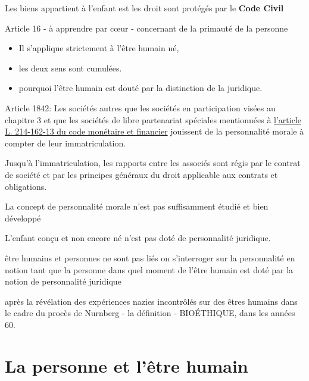 \documentclass[a4paper]{report}
\begin{document}
Les biens appartient à l'enfant est les droit sont protégés par le \textbf{Code Civil}

\begin{remark}
    Article 16 - à apprendre par cœur - concernant de la primauté de la personne
    \begin{itemize}
        \item Il s'applique strictement à l'être humain né,
        \item les deux sens sont cumulées.
        \item pourquoi l'être humain est douté par la distinction de la juridique.
    \end{itemize}
\end{remark}

Article 1842: Les sociétés autres que les sociétés en participation visées au
chapitre $3$ et que les sociétés de libre partenariat spéciales mentionnées à
\underline{l'article L. 214-162-13 du code monétaire et financier} jouissent de
la personnalité morale à compter de leur immatriculation.

Jusqu'à l'immatriculation, les rapports entre les associés sont régis par le
contrat de société et par les principes généraux du droit applicable aux
contrats et obligations.

La concept de personnalité morale n'est pas suffisamment étudié et bien développé

L'enfant conçu et non encore né n'est pas doté de personnalité juridique.

être humains et personnes ne sont pas liés
on s'interroger sur la personnalité en notion tant que la personne
dans quel moment de l'être humain est doté par la notion de personnalité juridique


après la révélation des expériences nazies incontrôlés sur des êtres humains dans le cadre du procès de Nurnberg - la définition - BIOÉTHIQUE, dans les années 60.

\section{La personne et l'être humain}%
\label{sec:La personne et l'être humain}
\end{document}
